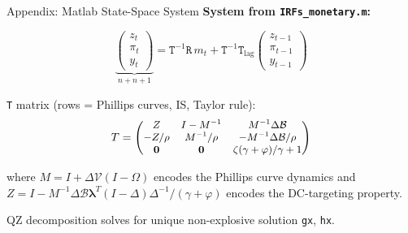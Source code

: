 \documentclass[aspectratio=169]{beamer}
\begin{document}
\begin{frame}{Appendix: Matlab State-Space System}
\textbf{System from \texttt{IRFs\_monetary.m}:}

\vspace{-0.2cm}
\begin{equation*}
    \underbrace{\begin{pmatrix}z_t\\\pi_t\\y_t\end{pmatrix}}_{n+n+1} = \texttt{T}^{-1}\texttt{R}\,m_t + \texttt{T}^{-1}\texttt{T}_{\text{lag}}\begin{pmatrix}z_{t-1}\\\pi_{t-1}\\y_{t-1}\end{pmatrix}
\end{equation*}

\texttt{T} matrix (rows = Phillips curves, IS, Taylor rule):
\begin{equation*}
\small
T = \begin{pmatrix}Z & I-M^{-1} & M^{-1}\Delta\mathcal{B} \\ -Z/\rho & M^{-1}/\rho & -M^{-1}\Delta\mathcal{B}/\rho \\ \mathbf{0} & \mathbf{0} & \zeta(\gamma+\varphi)/\gamma + 1\end{pmatrix}
\end{equation*}

where $M = I + \Delta\mathcal{V}(I-\Omega)$ encodes the Phillips curve dynamics and $Z = I - M^{-1}\Delta\mathcal{B}\bm{\lambda}^T(I-\Delta)\Delta^{-1}/(\gamma+\varphi)$ encodes the DC-targeting property.

QZ decomposition solves for unique non-explosive solution \texttt{gx}, \texttt{hx}.
\end{frame}
\end{document}
